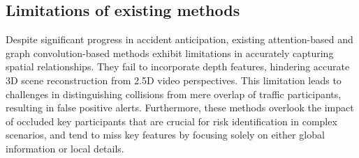 \subsection{Limitations of existing methods}

Despite significant progress in accident anticipation, existing attention-based and graph convolution-based methods exhibit limitations in accurately capturing spatial relationships. They fail to incorporate depth features, hindering accurate 3D scene reconstruction from 2.5D video perspectives. This limitation leads to challenges in distinguishing collisions from mere overlap of traffic participants, resulting in false positive alerts. Furthermore, these methods overlook the impact of occluded key participants that are crucial for risk identification in complex scenarios, and tend to miss key features by focusing solely on either global information or local details.